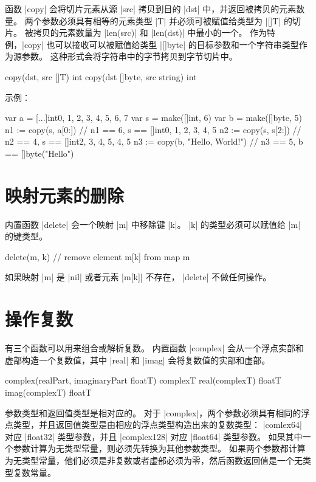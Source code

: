 函数 \code|copy| 会将切片元素从源 \code|src| 拷贝到目的 \code|dst| 中，并返回被拷贝的元素数量。
两个参数必须具有相等的元素类型 \code|T| 并必须可被赋值给类型为 \code|[]T| 的切片。
被拷贝的元素数量为 \code|len(src)| 和 \code|len(dst)| 中最小的一个。
作为特例，\code|copy| 也可以接收可以被赋值给类型 \code|[]byte| 的目标参数和一个字符串类型作为源参数。
这种形式会将字符串中的字节拷贝到字节切片中。
\begin{golang}
copy(dst, src []T) int
copy(dst []byte, src string) int
\end{golang}

示例：
\begin{golang}
var a = [...]int{0, 1, 2, 3, 4, 5, 6, 7}
var s = make([]int, 6)
var b = make([]byte, 5)
n1 := copy(s, a[0:])            // n1 == 6, s == []int{0, 1, 2, 3, 4, 5}
n2 := copy(s, s[2:])            // n2 == 4, s == []int{2, 3, 4, 5, 4, 5}
n3 := copy(b, "Hello, World!")  // n3 == 5, b == []byte("Hello")
\end{golang}

\section{映射元素的删除}
内置函数 \code|delete| 会一个映射 \code|m| 中移除键 \code|k|。
\code|k| 的类型必须可以赋值给 \code|m| 的键类型。
\begin{golang}
delete(m, k)  // remove element m[k] from map m
\end{golang}
如果映射 \code|m| 是 \code|nil| 或者元素 \code|m[k]| 不存在， \code|delete| 不做任何操作。

\section{操作复数}
有三个函数可以用来组合或解析复数。
内置函数 \code|complex| 会从一个浮点实部和虚部构造一个复数值，其中 \code|real| 和 \code|imag| 会将复数值的实部和虚部。
\begin{golang}
complex(realPart, imaginaryPart floatT) complexT
real(complexT) floatT
imag(complexT) floatT
\end{golang}

参数类型和返回值类型是相对应的。
对于 \code|complex|，两个参数必须具有相同的浮点类型，并且返回值类型是由相应的浮点类型构造出来的复数类型：
\code|comlex64| 对应 \code|float32| 类型参数，并且 \code|complex128| 对应 \code|float64| 类型参数。
如果其中一个参数计算为无类型常量，则必须先转换为其他参数类型。
如果两个参数都计算为无类型常量，他们必须是非复数或者虚部必须为零，然后函数返回值是一个无类型复数常量。

